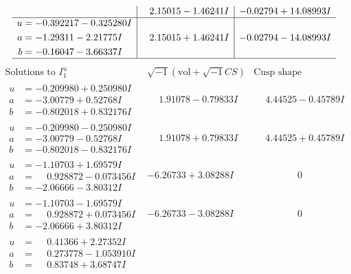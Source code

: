 \documentclass[1p]{elsarticle_modified}
\theoremstyle{definition}
\newcommand{\I}{\sqrt{-1}}
\begin{document}
$$\begin{array}{c|c|c}
 & \phantom{-}2.15015 - 1.46241 I & -0.02794 + 14.08993 I \\ \hline\begin{aligned}
u &= -0.392217 - 0.325280 I \\
a &= -1.29311 - 2.21775 I \\
b &= -0.16047 - 3.66337 I\end{aligned}
 & \phantom{-}2.15015 + 1.46241 I & -0.02794 - 14.08993 I\\
 \hline 
 \end{array}$$\newpage$$\begin{array}{c|c|c}  
\text{Solutions to }I^u_{1}& \I (\text{vol} + \sqrt{-1}CS) & \text{Cusp shape}\\
 \hline 
\begin{aligned}
u &= -0.209980 + 0.250980 I \\
a &= -3.00779 + 0.52768 I \\
b &= -0.802018 + 0.832176 I\end{aligned}
 & \phantom{-}1.91078 - 0.79833 I & \phantom{-}4.44525 - 0.45789 I \\ \hline\begin{aligned}
u &= -0.209980 - 0.250980 I \\
a &= -3.00779 - 0.52768 I \\
b &= -0.802018 - 0.832176 I\end{aligned}
 & \phantom{-}1.91078 + 0.79833 I & \phantom{-}4.44525 + 0.45789 I \\ \hline\begin{aligned}
u &= -1.10703 + 1.69579 I \\
a &= \phantom{-}0.928872 - 0.073456 I \\
b &= -2.06666 - 3.80312 I\end{aligned}
 & -6.26733 + 3.08288 I & \phantom{-0.000000 } 0 \\ \hline\begin{aligned}
u &= -1.10703 - 1.69579 I \\
a &= \phantom{-}0.928872 + 0.073456 I \\
b &= -2.06666 + 3.80312 I\end{aligned}
 & -6.26733 - 3.08288 I & \phantom{-0.000000 } 0 \\ \hline\begin{aligned}
u &= \phantom{-}0.41366 + 2.27352 I \\
a &= \phantom{-}0.273778 - 1.053910 I \\
b &= \phantom{-}0.83748 + 3.68747 I\end{aligned}

\end{array}$$
\end{document}
